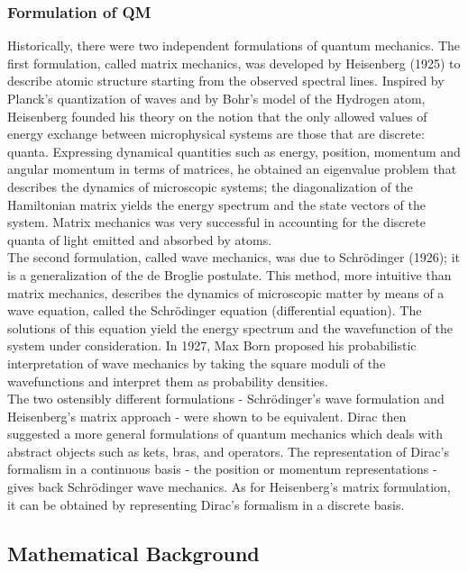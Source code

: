 \documentclass[a4paper]{article}
\begin{document}
\subsubsection*{Formulation of QM \cite{zettili2009quantum}}
\begin{Note}[Formulations of QM]
Historically, there were two independent formulations of quantum mechanics. The first formulation, called matrix mechanics, was developed by Heisenberg (1925) to describe atomic structure starting from the observed spectral lines. Inspired by Planck's quantization of waves and by Bohr's model of the Hydrogen atom, Heisenberg founded his theory on the notion that the only allowed values of energy exchange between microphysical systems are those that are discrete: quanta. Expressing dynamical quantities such as energy, position, momentum and angular momentum in terms of matrices, he obtained an eigenvalue problem that describes the dynamics of microscopic systems; the diagonalization of the Hamiltonian matrix yields the energy spectrum and the state vectors of the system. Matrix mechanics was very successful in accounting for the discrete quanta of light emitted and absorbed by atoms.\\[5pt]
The second formulation, called wave mechanics, was due to Schr\"{o}dinger (1926); it is a generalization of the de Broglie postulate. This method, more intuitive than matrix mechanics, describes the dynamics of microscopic matter by means of a wave equation, called the Schr\"{o}dinger equation (differential equation). The solutions of this equation yield the energy spectrum and the wavefunction of the system under consideration. In 1927, Max Born proposed his probabilistic interpretation of wave mechanics by taking the square moduli of the wavefunctions and interpret them as probability densities.\\[5pt]
The two ostensibly different formulations - Schr\"{o}dinger's wave formulation and Heisenberg's matrix approach - were shown to be equivalent. Dirac then suggested a more general formulations of quantum mechanics which deals with abstract objects such as kets, bras, and operators. The representation of Dirac's formalism in a continuous basis - the position or momentum representations - gives back Schr\"{o}dinger wave mechanics. As for Heisenberg's matrix formulation, it can be obtained by representing Dirac's formalism in a discrete basis. 
\end{Note}

\newpage
\subsection{Mathematical Background}
\end{document}
